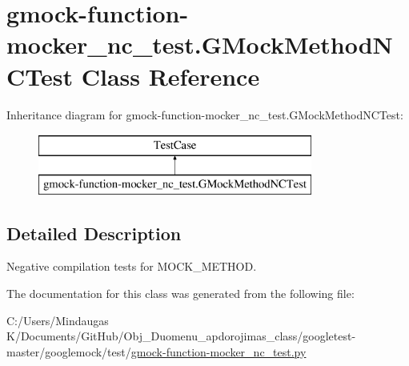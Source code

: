 \hypertarget{classgmock-function-mocker__nc__test_1_1_g_mock_method_n_c_test}{}\section{gmock-\/function-\/mocker\+\_\+nc\+\_\+test.G\+Mock\+Method\+N\+C\+Test Class Reference}
\label{classgmock-function-mocker__nc__test_1_1_g_mock_method_n_c_test}
Inheritance diagram for gmock-\/function-\/mocker\+\_\+nc\+\_\+test.G\+Mock\+Method\+N\+C\+Test\+:\begin{figure}[H]
\begin{center}
\leavevmode
\includegraphics[height=2.000000cm]{db/da0/classgmock-function-mocker__nc__test_1_1_g_mock_method_n_c_test}
\end{center}
\end{figure}


\subsection{Detailed Description}
\begin{DoxyVerb}Negative compilation tests for MOCK_METHOD.\end{DoxyVerb}
 

The documentation for this class was generated from the following file\+:\begin{DoxyCompactItemize}
\item 
C\+:/\+Users/\+Mindaugas K/\+Documents/\+Git\+Hub/\+Obj\+\_\+\+Duomenu\+\_\+apdorojimas\+\_\+class/googletest-\/master/googlemock/test/\mbox{\hyperlink{googletest-master_2googlemock_2test_2gmock-function-mocker__nc__test_8py}{gmock-\/function-\/mocker\+\_\+nc\+\_\+test.\+py}}\end{DoxyCompactItemize}
